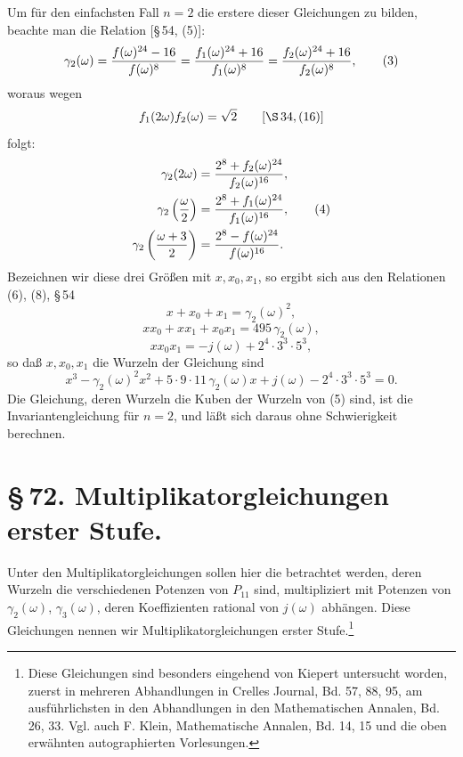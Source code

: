 \documentclass[11pt]{article}
\begin{document}
Um für den einfachsten Fall $n=2$ die erstere dieser Gleichungen zu bilden, beachte man die Relation [\S\,54, (5)]:
\begin{equation}
 \gamma_2(\omega)={f(\omega)^{24}-16\over f(\omega)^8}
 ={f_1(\omega)^{24}+16\over f_1(\omega)^8}
 ={f_2(\omega)^{24}+16\over f_2(\omega)^8},
\tag{3}
\end{equation}
woraus wegen
\[
 f_1(2\omega)f_2(\omega)=\sqrt{2}
 \qquad [\S\,34,(16)]
\]
folgt:
\begin{align}
\gamma_2(2\omega)&={2^8+f_2(\omega)^{24}\over f_2(\omega)^{16}},\notag\\
\gamma_2\left({\omega\over2}\right)&={2^8+f_1(\omega)^{24}\over f_1(\omega)^{16}},\tag{4}\\
\gamma_2\left({\omega+3\over2}\right)&={2^8-f(\omega)^{24}\over f(\omega)^{16}}.\notag
\end{align}
Bezeichnen wir diese drei Größen mit $x,x_0,x_1$, so ergibt sich aus den Relationen (6), (8), \S\,54
\[
 x+x_0+x_1=\gamma_2(\omega)^2,
\]
\[
 xx_0+xx_1+x_0x_1=495\,\gamma_2(\omega),
\]
\[
 xx_0x_1=-j(\omega)+2^4\cdot3^3\cdot5^3,
\]
so daß $x,x_0,x_1$ die Wurzeln der Gleichung sind
\begin{equation}
 x^3-\gamma_2(\omega)^2x^2+5\cdot9\cdot11\,\gamma_2(\omega)x+j(\omega)-2^4\cdot3^3\cdot5^3=0.
\tag{5}
\end{equation}
Die Gleichung, deren Wurzeln die Kuben der Wurzeln von (5) sind, ist die Invariantengleichung für $n=2$, und läßt sich daraus ohne Schwierigkeit berechnen.

\section*{\S\,72. Multiplikatorgleichungen erster Stufe.}

Unter den Multiplikatorgleichungen sollen hier die betrachtet werden, deren Wurzeln die verschiedenen Potenzen von $P_{11}$ sind, multipliziert mit Potenzen von $\gamma_2(\omega)$, $\gamma_3(\omega)$, deren Koeffizienten rational von $j(\omega)$ abhängen. Diese Gleichungen nennen wir Multiplikatorgleichungen erster Stufe.\footnote{Diese Gleichungen sind besonders eingehend von Kiepert untersucht worden, zuerst in mehreren Abhandlungen in Crelles Journal, Bd. 57, 88, 95, am ausführlichsten in den Abhandlungen in den Mathematischen Annalen, Bd. 26, 33. Vgl. auch F. Klein, Mathematische Annalen, Bd. 14, 15 und die oben erwähnten autographierten Vorlesungen.}
\end{document}
